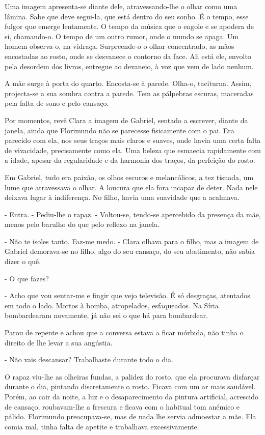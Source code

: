 Uma imagem apresenta-se diante dele, atravessando-lhe o olhar como uma
lâmina. Sabe que deve segui-la, que está dentro do seu sonho. É o tempo,
esse fulgor que emerge lentamente. O tempo da música que o engole e se
apodera de si, chamando-o. O tempo de um outro rumor, onde o mundo se
apaga. Um homem observa-o, na vidraça. Surpreende-o o olhar concentrado,
as mãos encostadas ao rosto, onde se desvanece o contorno da face. Ali
está ele, envolto pela desordem dos livros, entregue ao devaneio, à voz
que vem de lado nenhum.

A mãe surge à porta do quarto. Encosta-se à parede. Olha-o, taciturna.
Assim, projecta-se a sua sombra contra a parede. Tem as pálpebras
escuras, maceradas pela falta de sono e pelo cansaço.

Por momentos, revê Clara a imagem de Gabriel, sentado a escrever, diante
da janela, ainda que Florimundo não se parecesse fisicamente com o pai.
Era parecido com ela, nos seus traços mais claros e suaves, onde havia
uma certa falta de vivacidade, precisamente como ela. Uma beleza que
esmaecia rapidamente com a idade, apesar da regularidade e da harmonia
dos traços, da perfeição do rosto.

Em Gabriel, tudo era paixão, os olhos escuros e melancólicos, a tez
tisnada, um lume que atravessava o olhar. A loucura que ela fora incapaz
de deter. Nada nele deixava lugar à indiferença. No filho, havia uma
suavidade que a acalmava.

- Entra. - Pediu-lhe o rapaz. - Voltou-se, tendo-se apercebido da
presença da mãe, menos pelo barulho do que pelo reflexo na janela.

- Não te isoles tanto. Faz-me medo. - Clara olhava para o filho, mas a
imagem de Gabriel demorava-se no filho, algo do seu cansaço, do seu
abatimento, não sabia dizer o quê.

- O que fazes?

- Acho que vou sentar-me e fingir que vejo televisão. É só desgraças,
atentados em todo o lado. Mortos à bomba, atropelados, esfaqueados. Na
Síria bombardearam novamente, já não sei o que há para bombardear.

Parou de repente e achou que a conversa estava a ficar mórbida, não
tinha o direito de lhe levar a sua angústia.

- Não vais descansar? Trabalhaste durante todo o dia.

O rapaz viu-lhe as olheiras fundas, a palidez do rosto, que ela
procurava disfarçar durante o dia, pintando discretamente o rosto.
Ficava com um ar mais saudável. Porém, ao cair da noite, a luz e o
desaparecimento da pintura artificial, acrescido de cansaço,
roubavam-lhe a frescura e ficava com o habitual tom anémico e pálido.
Florimundo preocupava-se, mas de nada lhe servia admoestar a mãe. Ela
comia mal, tinha falta de apetite e trabalhava excessivamente.

